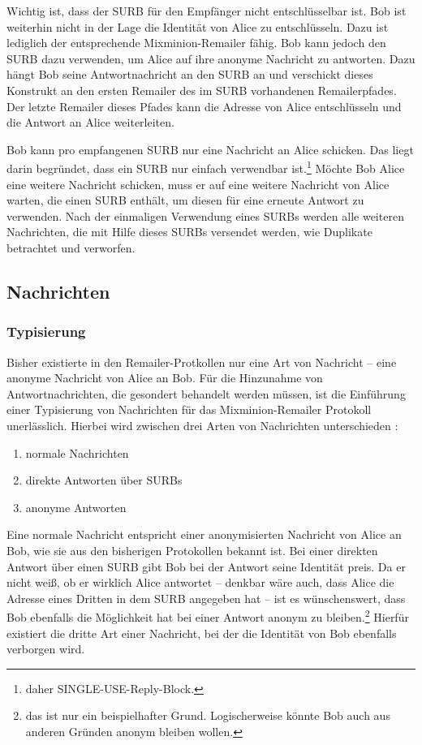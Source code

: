 Wichtig ist, dass der SURB für den Empfänger nicht entschlüsselbar ist. Bob ist weiterhin nicht in der Lage die Identität von Alice zu entschlüsseln. Dazu ist lediglich der entsprechende Mixminion-Remailer fähig. Bob kann jedoch den SURB dazu verwenden, um Alice auf ihre anonyme Nachricht zu antworten. Dazu hängt Bob seine Antwortnachricht an den SURB an und verschickt dieses Konstrukt an den ersten Remailer des im SURB vorhandenen Remailerpfades. Der letzte Remailer dieses Pfades kann die Adresse von Alice entschlüsseln und die Antwort an Alice weiterleiten.

Bob kann pro empfangenen SURB nur eine Nachricht an Alice schicken. Das liegt darin begründet, dass ein SURB nur einfach verwendbar ist.\footnote{daher SINGLE-USE-Reply-Block.} Möchte Bob Alice eine weitere Nachricht schicken, muss er auf eine weitere Nachricht von Alice warten, die einen SURB enthält, um diesen für eine erneute Antwort zu verwenden. Nach der einmaligen Verwendung eines SURBs werden alle weiteren Nachrichten, die mit Hilfe dieses SURBs versendet werden, wie Duplikate betrachtet und verworfen.

\subsection{Nachrichten}
\subsubsection{Typisierung}
Bisher existierte in den Remailer-Protkollen nur eine Art von Nachricht -- eine anonyme Nachricht von Alice an Bob. Für die Hinzunahme von Antwortnachrichten, die gesondert behandelt werden müssen, ist die Einführung einer Typisierung von Nachrichten für das Mixminion-Remailer Protokoll unerlässlich. Hierbei wird zwischen drei Arten von Nachrichten unterschieden \cite[S. 4]{mixminion}:

\begin{enumerate}
\item normale Nachrichten
\item direkte Antworten über SURBs
\item anonyme Antworten
\end{enumerate}

Eine normale Nachricht entspricht einer anonymisierten Nachricht von Alice an Bob, wie sie aus den bisherigen Protokollen bekannt ist. Bei einer direkten Antwort über einen SURB gibt Bob bei der Antwort seine Identität preis. Da er nicht weiß, ob er wirklich Alice antwortet -- denkbar wäre auch, dass Alice die Adresse eines Dritten in dem SURB angegeben hat -- ist es wünschenswert, dass Bob ebenfalls die Möglichkeit hat bei einer Antwort anonym zu bleiben.\footnote{das ist nur ein beispielhafter Grund. Logischerweise könnte Bob auch aus anderen Gründen anonym bleiben wollen.} Hierfür existiert die dritte Art einer Nachricht, bei der die Identität von Bob ebenfalls verborgen wird.

